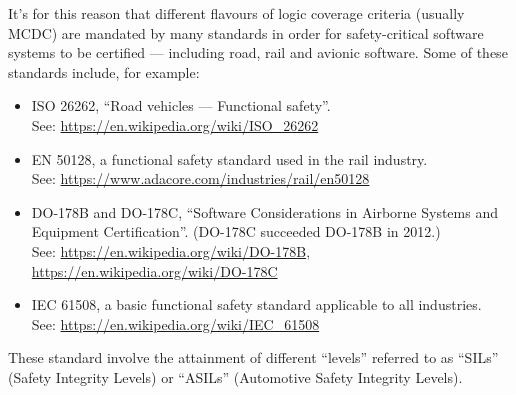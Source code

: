 It's for this reason that different flavours of logic coverage criteria (usually
MCDC) are mandated by many standards in order for safety-critical software
systems to be certified --- including road, rail and avionic software. Some of
these standards include, for example:



\begin{itemize}

    \item ISO 26262, ``Road vehicles --- Functional safety''.\\
    See: \url{https://en.wikipedia.org/wiki/ISO_26262}

    \item EN 50128, a functional safety standard used in the rail industry.\\
    See: \url{https://www.adacore.com/industries/rail/en50128}

    \item DO-178B and DO-178C, ``Software Considerations in Airborne Systems and Equipment
    Certification''. (DO-178C succeeded DO-178B in 2012.)\\
    See: \url{https://en.wikipedia.org/wiki/DO-178B}, \url{https://en.wikipedia.org/wiki/DO-178C}

    \item IEC 61508, a basic functional safety standard applicable to all
    industries.\\
    See: \url{https://en.wikipedia.org/wiki/IEC_61508}
    
\end{itemize}

These standard involve the attainment of different ``levels'' referred to as
``SILs'' (Safety Integrity Levels) or ``ASILs'' (Automotive Safety Integrity
Levels).

